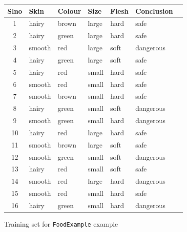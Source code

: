 \documentclass{report}
\begin{document}
\begin{figure}[h]
  \centering
  \begin{tabular}{|c|l|l|l|l|l|l|}
    \hline
   Slno & Skin	& Colour & Size & Flesh & Conclusion\\
    \hline
    1 & hairy &	brown &	large &	hard & safe	
    \\\hline
    2 & hairy & green & large & hard & safe
    \\\hline
    3 & smooth & red & large & soft & dangerous
    \\\hline
    4 & hairy & green & large & soft & safe	
    \\\hline
    5 & hairy &	red & small	& hard	& safe
    \\\hline
    6 & smooth & red & small & hard & safe	
    \\\hline
    7 & smooth & brown & small & hard &	safe	
    \\\hline
    8 & hairy &	green &	small &	soft & dangerous	
    \\\hline
    9 & smooth & green & small & hard &	dangerous
    \\\hline
    10 & hairy & red & large & hard & safe
    \\\hline
    11 & smooth & brown & large & soft & safe	
    \\\hline
    12 & smooth	& green & small	& soft	& dangerous
    \\\hline
    13 & hairy	& red & small & soft & safe	
    \\\hline
    14 & smooth	& red &	large &	hard & dangerous
    \\\hline
    15 & smooth & red & small &	hard & safe
    \\\hline
    16 & hairy & green & small & hard & dangerous		
    \\\hline
                 
    
  \end{tabular}
  \caption{Training set for \texttt{FoodExample} example}
  \label{fig:foodexample}
\end{figure}
\end{document}
